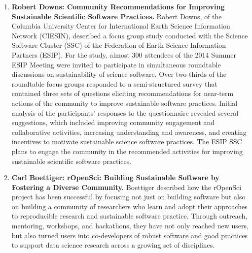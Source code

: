 \documentclass[11pt, oneside]{amsart}
\begin{document}
\begin{enumerate}
\item \textbf{Robert Downs: Community Recommendations for Improving Sustainable
Scientific Software Practices.}
Robert Downs, of the Columbia University Center for International Earth
Science Information Network (CIESIN), 
described a
focus group study conducted with %
the Science Software Cluster (SSC) of the
Federation of Earth Science Information Partners (ESIP). For the study, almost
300 attendees of the 2014 Summer ESIP Meeting were invited to participate in
simultaneous roundtable discussions on sustainability of science software. Over
two-thirds of the roundtable focus groups responded to a semi-structured survey
that contained three sets of questions eliciting recommendations for near-term
actions of the community to improve sustainable software practices. Initial
analysis of the
participants' responses to the questionnaire revealed several suggestions, which
included improving community engagement and collaborative activities, increasing
understanding and awareness, and creating incentives to motivate sustainable
science software practices.
The ESIP SSC plans to engage the community %
in the recommended activities for improving sustainable scientific
software practices.

\begin{comment}
Downs RR, Lenhardt WC, Robinson E, Davis E, Weber N. 2014. Community
Recommendations for Improving Sustainable Scientific Software Practices. 2nd
Workshop on Sustainable Software for Science: Practice and Experiences
(WSSSPE2), New Orleans, Louisiana, 16 November 2014.
http://wssspe.researchcomputing.org.uk/wp-content/uploads/2014/11/Downs.pdf and
http://dx.doi.org/10.7916/D8Q52NBC
\end{comment}

\item \textbf{Carl Boettiger: rOpenSci: Building Sustainable Software by Fostering a
Diverse Community.}
Boettiger described how the rOpenSci project has been successful by focusing not
just on building software but also on building a community of researchers who
learn and adopt their approaches to reproducible research and sustainable
software practice. Through outreach, mentoring, workshops, and hackathons, they
have not only reached new users, but also turned users into co-developers of
robust software and good practices to support data science research across a
growing set of disciplines.


\end{enumerate}
\end{document}
